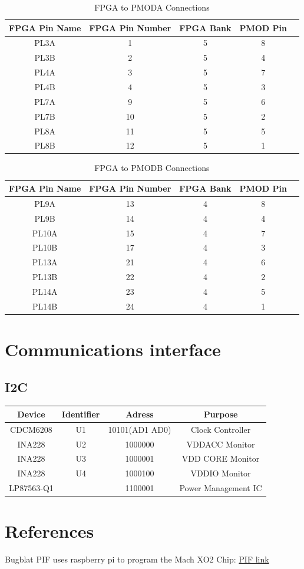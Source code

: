 \documentclass{article}
\begin{document}
\begin{table}[h!]
    \centering
    \begin{tabular}{ c c c c c}
    FPGA Pin Name & FPGA Pin Number & FPGA Bank & PMOD Pin \\
    \hline
    PL3A   & 1  & 5   & 8   \\
    PL3B   & 2  & 5   & 4   \\
    PL4A   & 3  & 5   & 7   \\
    PL4B   & 4  & 5   & 3   \\
    PL7A   & 9  & 5   & 6   \\
    PL7B   & 10 & 5   & 2   \\
    PL8A   & 11 & 5   & 5   \\
    PL8B   & 12 & 5   & 1   \\
    \end{tabular}
    \caption{FPGA to PMODA Connections}
    \label{table:fpga_pmoda}
\end{table}


\begin{table}[h!]
    \centering
    \begin{tabular}{ c c c c c}
    FPGA Pin Name & FPGA Pin Number & FPGA Bank & PMOD Pin \\
    \hline
    PL9A   & 13 & 4   & 8   \\
    PL9B   & 14 & 4   & 4   \\
    PL10A  & 15 & 4   & 7   \\
    PL10B  & 17 & 4   & 3   \\
    PL13A  & 21 & 4   & 6   \\
    PL13B  & 22 & 4   & 2   \\
    PL14A  & 23 & 4   & 5   \\
    PL14B  & 24 & 4   & 1   \\
    \end{tabular}
    \caption{FPGA to PMODB Connections}
    \label{table:fpga_pmodb}
\end{table}



\section{Communications interface}

\subsection{I2C}

\begin{center}
    \begin{tabular}{ c c c c}
    Device & Identifier & Adress & Purpose \\
    \hline
    CDCM6208 & U1 & 10101(AD1 AD0) & Clock Controller \\
    INA228 & U2 & 1000000 &  VDDACC Monitor \\
    INA228 & U3 & 1000001 & VDD CORE Monitor \\
    INA228 & U4 & 1000100 & VDDIO Monitor \\
    LP87563-Q1 & & 1100001 & Power Management IC 
    \end{tabular}
\end{center}

\section{References}
Bugblat PIF uses raspberry pi to program the Mach XO2 Chip: \href{https://www.bugblat.com/products/pif/index.html}{PIF link}
\end{document}

